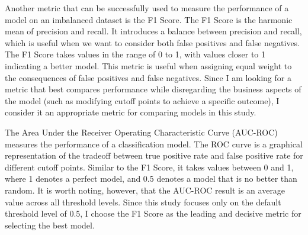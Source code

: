 Another metric that can be successfully used to measure the performance of a model on an imbalanced dataset is the F1 Score. The F1 Score is the harmonic mean of precision and recall. It introduces a balance between precision and recall, which is useful when we want to consider both false positives and false negatives. The F1 Score takes values in the range of 0 to 1, with values closer to 1 indicating a better model. This metric is useful when assigning equal weight to the consequences of false positives and false negatives. Since I am looking for a metric that best compares performance while disregarding the business aspects of the model (such as modifying cutoff points to achieve a specific outcome), I consider it an appropriate metric for comparing models in this study.

The Area Under the Receiver Operating Characteristic Curve (AUC-ROC) measures the performance of a classification model. The ROC curve is a graphical representation of the tradeoff between true positive rate and false positive rate for different cutoff points. Similar to the F1 Score, it takes values between 0 and 1, where 1 denotes a perfect model, and 0.5 denotes a model that is no better than random. It is worth noting, however, that the AUC-ROC result is an average value across all threshold levels. Since this study focuses only on the default threshold level of 0.5, I choose the F1 Score as the leading and decisive metric for selecting the best model.

